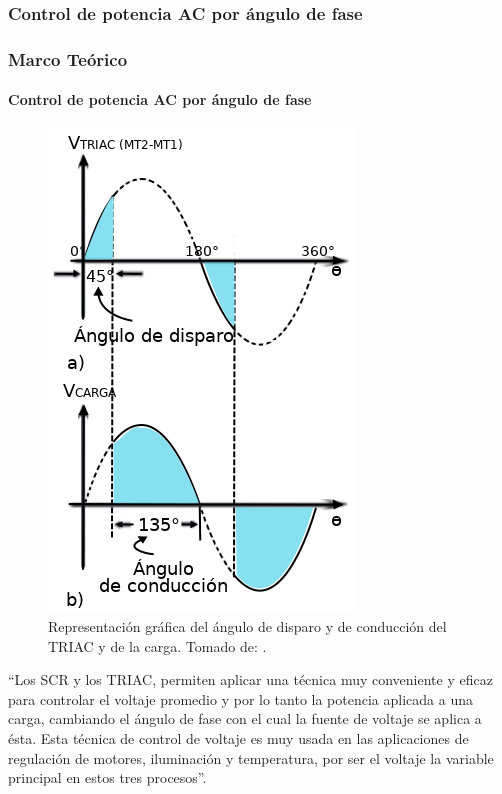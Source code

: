 \begin{frame}
\subsubsection{Control de potencia AC por ángulo de fase}
\frametitle{Marco Teórico}
\framesubtitle{Control de potencia AC por ángulo de fase}
\begin{figure}
	\centering
	\caption{{\scriptsize Representación gráfica del ángulo de disparo y de conducción del TRIAC y de la carga. Tomado de: \cite{CEKIT}.}}
	\label{fig:triacgraph}
	\includegraphics[width=0.6\linewidth]{Imagenes/TRIAC_graph}
\end{figure}
``Los SCR y los TRIAC, permiten aplicar una técnica muy conveniente y eficaz para controlar el voltaje promedio y por lo tanto la potencia aplicada a una carga, cambiando el ángulo de fase con el cual la fuente de voltaje se aplica a ésta. Esta técnica de control de voltaje es muy usada en las aplicaciones de regulación de motores, iluminación y temperatura, por ser el voltaje la variable principal en estos tres procesos''.\cite{CEKIT}

\end{frame}

